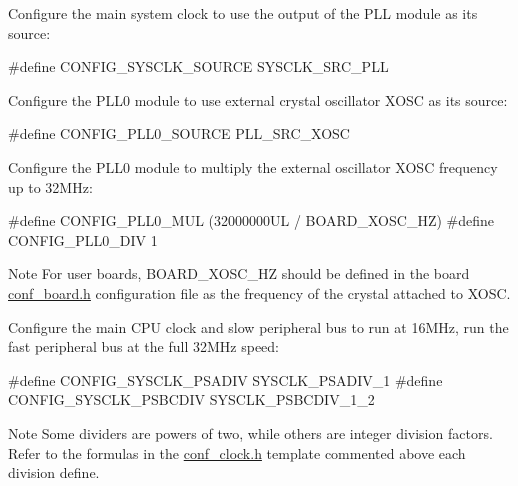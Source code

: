 \begin{DoxyEnumerate}
\item Configure the main system clock to use the output of the P\-L\-L module as its source\-: 
\begin{DoxyCode}
\textcolor{preprocessor}{ #define CONFIG\_SYSCLK\_SOURCE          SYSCLK\_SRC\_PLL }
\end{DoxyCode}

\item Configure the P\-L\-L0 module to use external crystal oscillator X\-O\-S\-C as its source\-: 
\begin{DoxyCode}
\textcolor{preprocessor}{ #define CONFIG\_PLL0\_SOURCE            PLL\_SRC\_XOSC }
\end{DoxyCode}

\item Configure the P\-L\-L0 module to multiply the external oscillator X\-O\-S\-C frequency up to 32\-M\-Hz\-: 
\begin{DoxyCode}
\textcolor{preprocessor}{        #define CONFIG\_PLL0\_MUL             (32000000UL / BOARD\_XOSC\_HZ)}
\textcolor{preprocessor}{        #define CONFIG\_PLL0\_DIV             1}
\end{DoxyCode}
 \begin{DoxyNote}{Note}
For user boards, {\ttfamily B\-O\-A\-R\-D\-\_\-\-X\-O\-S\-C\-\_\-\-H\-Z} should be defined in the board {\ttfamily \hyperlink{conf__board_8h}{conf\-\_\-board.\-h}} configuration file as the frequency of the crystal attached to X\-O\-S\-C.
\end{DoxyNote}

\item Configure the main C\-P\-U clock and slow peripheral bus to run at 16\-M\-Hz, run the fast peripheral bus at the full 32\-M\-Hz speed\-: 
\begin{DoxyCode}
\textcolor{preprocessor}{        #define CONFIG\_SYSCLK\_PSADIV       SYSCLK\_PSADIV\_1}
\textcolor{preprocessor}{        #define CONFIG\_SYSCLK\_PSBCDIV      SYSCLK\_PSBCDIV\_1\_2}
\end{DoxyCode}
 \begin{DoxyNote}{Note}
Some dividers are powers of two, while others are integer division factors. Refer to the formulas in the \hyperlink{conf__clock_8h}{conf\-\_\-clock.\-h} template commented above each division define. 
\end{DoxyNote}

\end{DoxyEnumerate}